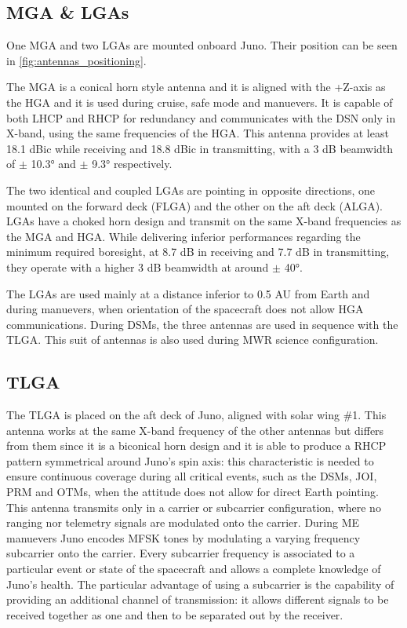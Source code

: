 \subsection{MGA \& LGAs}
\label{subsec:mga e lga}

One MGA and two LGAs are mounted onboard Juno. Their position can be seen in \autoref{fig:antennas_positioning}.

The MGA is a conical horn style antenna and it is aligned with the +Z-axis as the HGA and it is used during cruise, safe mode and manuevers. It is capable of both LHCP and RHCP for redundancy and communicates with the DSN only in X-band, using the same frequencies of the HGA. This antenna provides at least 18.1 dBic while receiving and 18.8 dBic in transmitting, with a 3 dB beamwidth of $\pm$ 10.3° and $\pm$ 9.3° respectively. 

The two identical and coupled LGAs are pointing in opposite directions, one mounted on the forward deck (FLGA) and the other on the aft deck (ALGA). LGAs have a choked horn design and transmit on the same X-band frequencies as the MGA and HGA. While delivering inferior performances regarding the minimum required boresight, at 8.7 dB in receiving and 7.7 dB in transmitting, they operate with a higher 3 dB beamwidth at around $\pm$ 40°\cite{juno_telecommunication}. 

The LGAs are used mainly at a distance inferior to 0.5 AU from Earth and during manuevers, when orientation of the spacecraft does not allow HGA communications. During DSMs, the three antennas are used in sequence with the TLGA. This suit of antennas is also used during MWR science configuration.

\subsection{TLGA}
\label{subsec:tlga}

The TLGA is placed on the aft deck of Juno, aligned with solar wing $\#$1. This antenna works at the same X-band frequency of the other antennas but differs from them since it is a biconical horn design and it is able to produce a RHCP pattern symmetrical around Juno's spin axis: this characteristic is needed to ensure continuous coverage during all critical events, such as the DSMs, JOI, PRM and OTMs, when the attitude does not allow for direct Earth pointing. 
This antenna transmits only in a carrier or subcarrier configuration, where no ranging nor telemetry signals are modulated onto the carrier. During ME manuevers Juno encodes MFSK tones by modulating a varying frequency subcarrier onto the carrier. Every subcarrier frequency is associated to a particular event or state of the spacecraft and allows a complete knowledge of Juno's health. The particular advantage of using a subcarrier is the capability of providing an additional channel of transmission: it allows different signals to be received together as one and then to be separated out by the receiver.


